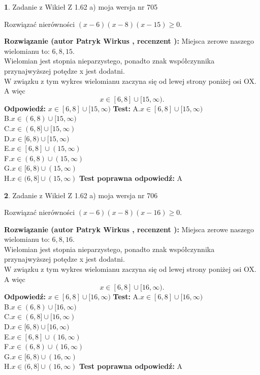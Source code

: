 \documentclass[12pt, a4paper]{article}
\theoremstyle{definition} %
\newtheorem{zad}{}
\newcommand{\zadStart}[1]{\begin{zad}#1\newline}
\newcommand{\zadStop}{\end{zad}}
\newcommand{\rozwStart}[2]{\noindent \textbf{Rozwiązanie (autor #1 , recenzent #2): }\newline}
\newcommand{\rozwStop}{\newline}
\newcommand{\odpStart}{\noindent \textbf{Odpowiedź:}\newline}
\newcommand{\odpStop}{\newline}
\newcommand{\testStart}{\noindent \textbf{Test:}\newline}
\newcommand{\testStop}{\newline}
\newcommand{\kluczStart}{\noindent \textbf{Test poprawna odpowiedź:}\newline}
\newcommand{\kluczStop}{\newline}
\begin{document}
\zadStart{Zadanie z Wikieł Z 1.62 a) moja wersja nr 705}

Rozwiązać nierówności $(x-6)(x-8)(x-15)\ge0$.
\zadStop
\rozwStart{Patryk Wirkus}{}
Miejsca zerowe naszego wielomianu to: $6, 8, 15$.\\
Wielomian jest stopnia nieparzystego, ponadto znak współczynnika przy\linebreak najwyższej potędze x jest dodatni.\\ W związku z tym wykres wielomianu zaczyna się od lewej strony poniżej osi OX. A więc $$x \in [6,8] \cup [15,\infty).$$
\rozwStop
\odpStart
$x \in [6,8] \cup [15,\infty)$
\odpStop
\testStart
A.$x \in [6,8] \cup [15,\infty)$\\
B.$x \in (6,8) \cup [15,\infty)$\\
C.$x \in (6,8] \cup [15,\infty)$\\
D.$x \in [6,8) \cup [15,\infty)$\\
E.$x \in [6,8] \cup (15,\infty)$\\
F.$x \in (6,8) \cup (15,\infty)$\\
G.$x \in [6,8) \cup (15,\infty)$\\
H.$x \in (6,8] \cup (15,\infty)$
\testStop
\kluczStart
A
\kluczStop



\zadStart{Zadanie z Wikieł Z 1.62 a) moja wersja nr 706}

Rozwiązać nierówności $(x-6)(x-8)(x-16)\ge0$.
\zadStop
\rozwStart{Patryk Wirkus}{}
Miejsca zerowe naszego wielomianu to: $6, 8, 16$.\\
Wielomian jest stopnia nieparzystego, ponadto znak współczynnika przy\linebreak najwyższej potędze x jest dodatni.\\ W związku z tym wykres wielomianu zaczyna się od lewej strony poniżej osi OX. A więc $$x \in [6,8] \cup [16,\infty).$$
\rozwStop
\odpStart
$x \in [6,8] \cup [16,\infty)$
\odpStop
\testStart
A.$x \in [6,8] \cup [16,\infty)$\\
B.$x \in (6,8) \cup [16,\infty)$\\
C.$x \in (6,8] \cup [16,\infty)$\\
D.$x \in [6,8) \cup [16,\infty)$\\
E.$x \in [6,8] \cup (16,\infty)$\\
F.$x \in (6,8) \cup (16,\infty)$\\
G.$x \in [6,8) \cup (16,\infty)$\\
H.$x \in (6,8] \cup (16,\infty)$
\testStop
\kluczStart
A
\kluczStop
\end{document}
